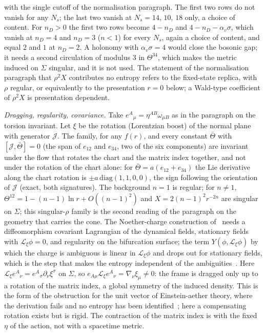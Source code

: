 with the single cutoff of the normalisation paragraph. The first two rows do not vanish for any \(N_s\); the last two vanish at \(N_s=14\), \(10\), \(18\) only, a choice of content. For \(n_D>0\) the first two rows become \(4-n_D\) and \(4-n_D-\alpha_v\sigma\), which vanish at \(n_D=4\) and \(n_D=3\) (\(n<1\)) for every \(N_s\), again a choice of content, and equal \(2\) and \(1\) at \(n_D=2\). A holonomy with \(\alpha_v\sigma=4\) would close the bosonic gap; it needs a second circulation of modulus \(3\) in \(\Theta^{34}\), which makes the metric induced on \(\Sigma\) singular, and it is not used. The statement of the normalisation paragraph that \(\rho^2X\) contributes no entropy refers to the fixed-state replica, with \(\rho\) regular, or equivalently to the presentation \(r=0\) below; a Wald-type coefficient of \(\rho^2X\) is presentation dependent.

\emph{Dragging, regularity, covariance.} Take \(e^A{}_\mu=\eta^{AB}\omega_{\mu B}\) as in the paragraph on the torsion invariant. Let \(\xi\) be the rotation (Lorentzian boost) of the normal plane with generator \(\mathcal J\). The family, for any \(f(r)\), and every constant \(\bar\Theta\) with \([\mathcal J,\bar\Theta]=0\) (the span of \(e_{12}\) and \(e_{34}\), two of the six components) are invariant under the flow that rotates the chart and the matrix index together, and not under the rotation of the chart alone: for \(\bar\Theta=a(e_{12}+e_{34})\) the Lie derivative along the chart rotation is \(\pm a\,\mathrm{diag}(1,1,0,0)\), the sign following the orientation of \(\mathcal J\) (exact, both signatures). The background \(n=1\) is regular; for \(n\ne1\), \(\Theta^{12}=1-(n-1)\ln r+O((n-1)^2)\) and \(X=2(n-1)^2r^{-2n}\) are singular on \(\Sigma\); this singular-\(\rho\) family is the second reading of the paragraph on the geometry that carries the cone. The Noether-charge construction of~\cite{IyerWald1994} needs a diffeomorphism covariant Lagrangian of the dynamical fields, stationary fields with \(\mathcal L_\xi\phi=0\), and regularity on the bifurcation surface; the term \(Y(\phi,\mathcal L_\xi\phi)\) by which the charge is ambiguous is linear in \(\mathcal L_\xi\phi\) and drops out for stationary fields, which is the step that makes the entropy independent of the ambiguities~\cite{JacobsonKangMyers1994}. Here \(\mathcal L_\xi e^A{}_\nu=e^A{}_\sigma\partial_\nu\xi^\sigma\) on \(\Sigma\), so \(e_{A\mu}\mathcal L_\xi e^A{}_\nu=\nabla_\nu\xi_\mu\ne0\): the frame is dragged only up to a rotation of the matrix index, a global symmetry of the induced density. This is the form of the obstruction for the unit vector of Einstein-aether theory, where the derivation fails and no entropy has been identified~\cite{Foster2006}; here a compensating rotation exists but is rigid. The contraction of the matrix index is with the fixed \(\eta\) of the action, not with a spacetime metric.

